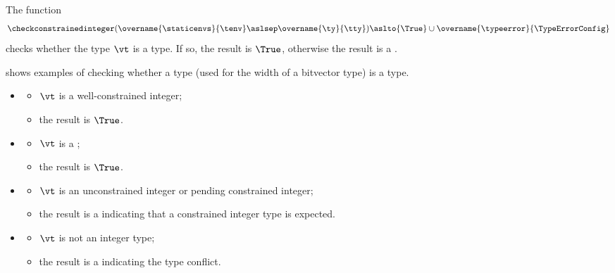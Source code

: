\hypertarget{def-checkconstrainedinteger}{}
The function
\[
  \checkconstrainedinteger(\overname{\staticenvs}{\tenv} \aslsep \overname{\ty}{\tty}) \aslto \{\True\} \cup \overname{\typeerror}{\TypeErrorConfig}
\]
checks whether the type $\vt$ is a \constrainedintegerterm{} type.
If so, the result is $\True$, otherwise the result is a \typingerrorterm.

shows examples of checking whether a type (used for the width of a bitvector type)
is a \constrainedintegerterm{} type.

\ProseParagraph
\OneApplies
\begin{itemize}
  \item {}
  \begin{itemize}
    \item $\vt$ is a well-constrained integer;
    \item the result is $\True$.
  \end{itemize}

  \item {}
  \begin{itemize}
    \item $\vt$ is a \parameterizedintegertypeterm;
    \item the result is $\True$.
  \end{itemize}

  \item {}
  \begin{itemize}
    \item $\vt$ is an unconstrained integer or pending constrained integer;
    \item the result is a \typingerrorterm{} indicating that a constrained integer type is expected.
  \end{itemize}

  \item {}
  \begin{itemize}
    \item $\vt$ is not an integer type;
    \item the result is a \typingerrorterm{} indicating the type conflict.
  \end{itemize}
\end{itemize}

